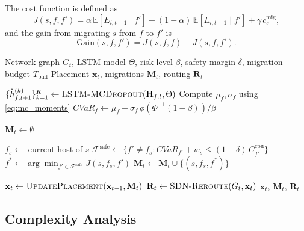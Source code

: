 \documentclass[conference]{IEEEtran}
\newcommand{\F}{\mathcal{F}}
\newcommand{\Set}[1]{\mathcal{#1}}
\begin{document}
The cost function is defined as
\begin{equation}
  J(s,f,f') = \alpha\,\mathbb{E}[E_{i,t+1}\!\mid f']
             + (1-\alpha)\,\mathbb{E}[L_{i,t+1}\!\mid f']
             + \gamma\,c_s^{\mathrm{mig}},
\end{equation}
and the gain from migrating $s$ from $f$ to $f'$ is
\begin{equation}
  \mathrm{Gain}(s,f,f') = J(s,f,f) - J(s,f,f').
\end{equation}

\begin{algorithm}[t]
\caption{RAI-Edge Joint Orchestration}\label{alg:raiEdge}
\small
\begin{algorithmic}[1]
\Require Network graph $G_t$, LSTM model $\Theta$, risk level $\beta$,
         safety margin $\delta$, migration budget $T_{\mathrm{bud}}$
\Ensure  Placement $\mathbf{x}_t$, migrations $\mathbf{M}_t$, routing $\mathbf{R}_t$

\For{each fog node $f \in \F$}
  \State $\{\hat{h}_{f,t+1}^{(k)}\}_{k=1}^{K}
         \leftarrow \textsc{LSTM-MCDropout}(\mathbf{H}_{f,t}, \Theta)$
  \State Compute $\mu_{f}, \sigma_{f}$ using \eqref{eq:mc_moments}
  \State $\mathit{CVaR}_f \leftarrow \mu_f +
         \sigma_f \,\phi(\Phi^{-1}(1-\beta))/\beta$
         \hfill{}
\EndFor

\State $\mathbf{M}_t \leftarrow \emptyset$

  \State $f_s \leftarrow$ current host of $s$
    \State $\Set{F}^{\mathrm{safe}} \leftarrow \{f'\neq f_s :
           \mathit{CVaR}_{f'} + w_s \leq (1-\delta)\,C_{f'}^{\mathrm{cpu}}\}$
    \State $f^* \leftarrow \arg\min_{f' \in \Set{F}^{\mathrm{safe}}}
           J(s, f_s, f')$
      \State $\mathbf{M}_t \leftarrow \mathbf{M}_t \cup \{(s, f_s, f^*)\}$
    \EndIf
  \EndIf
\EndFor

\State $\mathbf{x}_t \leftarrow \textsc{UpdatePlacement}(\mathbf{x}_{t-1},
       \mathbf{M}_t)$
\State $\mathbf{R}_t \leftarrow \textsc{SDN-Reroute}(G_t, \mathbf{x}_t)$
\State \Return $\mathbf{x}_t,\, \mathbf{M}_t,\, \mathbf{R}_t$
\end{algorithmic}
\end{algorithm}

\subsection{Complexity Analysis}
\end{document}
